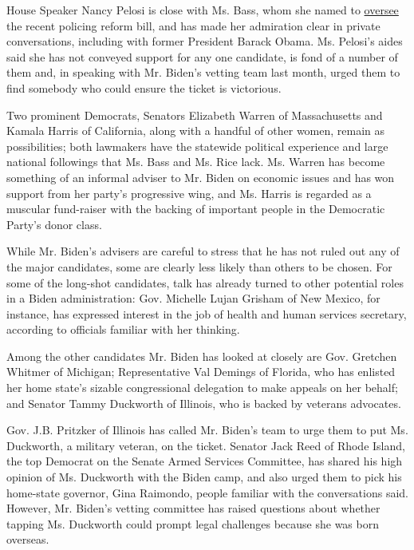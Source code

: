 House Speaker Nancy Pelosi is close with Ms. Bass, whom she named to
\href{https://www.nytimes3xbfgragh.onion/2020/06/10/us/politics/karen-bass.html}{oversee}
the recent policing reform bill, and has made her admiration clear in
private conversations, including with former President Barack Obama. Ms.
Pelosi's aides said she has not conveyed support for any one candidate,
is fond of a number of them and, in speaking with Mr. Biden's vetting
team last month, urged them to find somebody who could ensure the ticket
is victorious.

Two prominent Democrats, Senators Elizabeth Warren of Massachusetts and
Kamala Harris of California, along with a handful of other women, remain
as possibilities; both lawmakers have the statewide political experience
and large national followings that Ms. Bass and Ms. Rice lack. Ms.
Warren has become something of an informal adviser to Mr. Biden on
economic issues and has won support from her party's progressive wing,
and Ms. Harris is regarded as a muscular fund-raiser with the backing of
important people in the Democratic Party's donor class.

While Mr. Biden's advisers are careful to stress that he has not ruled
out any of the major candidates, some are clearly less likely than
others to be chosen. For some of the long-shot candidates, talk has
already turned to other potential roles in a Biden administration: Gov.
Michelle Lujan Grisham of New Mexico, for instance, has expressed
interest in the job of health and human services secretary, according to
officials familiar with her thinking.

Among the other candidates Mr. Biden has looked at closely are Gov.
Gretchen Whitmer of Michigan; Representative Val Demings of Florida, who
has enlisted her home state's sizable congressional delegation to make
appeals on her behalf; and Senator Tammy Duckworth of Illinois, who is
backed by veterans advocates.

Gov. J.B. Pritzker of Illinois has called Mr. Biden's team to urge them
to put Ms. Duckworth, a military veteran, on the ticket. Senator Jack
Reed of Rhode Island, the top Democrat on the Senate Armed Services
Committee, has shared his high opinion of Ms. Duckworth with the Biden
camp, and also urged them to pick his home-state governor, Gina
Raimondo, people familiar with the conversations said. However, Mr.
Biden's vetting committee has raised questions about whether tapping Ms.
Duckworth could prompt legal challenges because she was born overseas.

